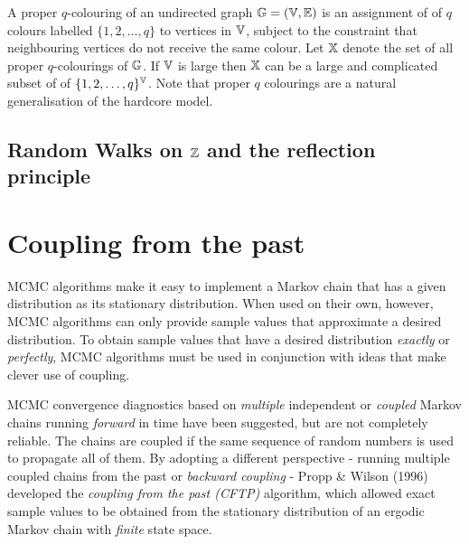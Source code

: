 \begin{model}
A proper $q$-colouring of an undirected graph $\mathbb{G}=(\mathbb{V},\mathbb{E})$ is an assignment of of $q$ colours labelled $\{1,2,\ldots,q\}$ to vertices in $\mathbb{V}$, subject to the constraint that neighbouring vertices do not receive the same colour.  
Let $\mathbb{X}$ denote the set of all proper $q$-colourings of $\mathbb{G}$.  
If $\mathbb{V}$ is large then $\mathbb{X}$ can be a large and complicated subset of of $\{1,2,\ldots,q\}^{\mathbb{V}}$.  
Note that proper $q$ colourings are a natural generalisation of the hardcore model.
\end{model}


\subsection{Random Walks on $\mathbb{Z}$ and the reflection principle}
\work

\section{Coupling from the past}



MCMC algorithms make it easy to implement a Markov chain that has a given distribution as its stationary distribution. When used on their own, however, MCMC algorithms can only provide sample values that approximate a desired distribution. To obtain sample values that have a desired distribution {\it exactly} or {\it perfectly}, MCMC algorithms must be used in conjunction with ideas that make clever use of coupling.

MCMC convergence diagnostics based on {\it multiple} independent or {\it coupled} Markov chains running {\it forward} in time have been suggested, but are not completely reliable. The chains are coupled if the same sequence of random numbers is used to propagate all of them. By adopting a different perspective - running multiple coupled chains from the past or {\it backward coupling} - Propp \& Wilson (1996) developed the {\it coupling from the past (CFTP)} algorithm, which allowed exact sample values to be obtained from the stationary distribution of an ergodic Markov chain with {\it finite} state space.

